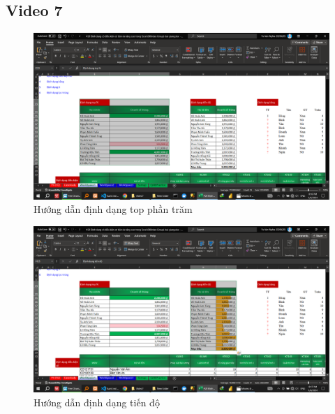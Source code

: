 \documentclass{article}
\begin{document}



\subsection{Video 7}
\begin{figure}[H]
\centering
\includegraphics[scale = 0.15]{Video7/HuongDan/0.png}
\caption{Hướng dẫn    định dạng top phần trăm}
\end{figure}


\begin{figure}[H]
\centering
\includegraphics[scale = 0.15]{Video7/HuongDan/1.png}
\caption{Hướng dẫn     định dạng tiến độ  }
\end{figure}
\end{document}
